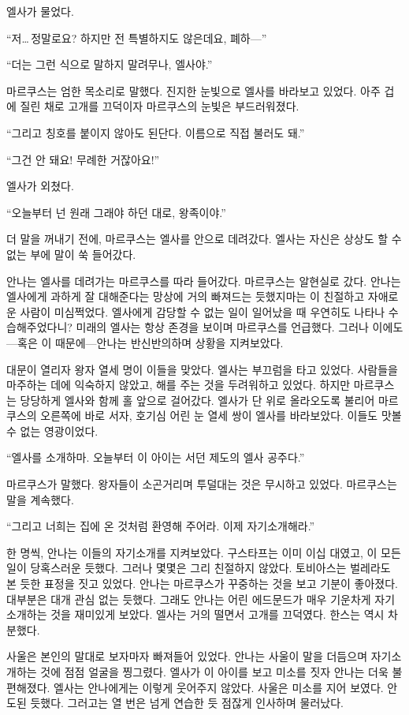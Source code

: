 엘사가 물었다.

``저\ldots\,정말로요? 하지만 전 특별하지도 않은데요, 폐하—''

``더는 그런 식으로 말하지 말려무나, 엘사야.''

마르쿠스는 엄한 목소리로 말했다. 진지한 눈빛으로 엘사를 바라보고 있었다. 아주 겁에 질린 채로 고개를 끄덕이자 마르쿠스의 눈빛은 부드러워졌다.

``그리고 칭호를 붙이지 않아도 된단다. 이름으로 직접 불러도 돼.''

``그건 안 돼요! 무례한 거잖아요!''

엘사가 외쳤다.

``오늘부터 넌 원래 그래야 하던 대로, 왕족이야.''

더 말을 꺼내기 전에, 마르쿠스는 엘사를 안으로 데려갔다. 엘사는 자신은 상상도 할 수 없는 부에 말이 쑥 들어갔다.

안나는 엘사를 데려가는 마르쿠스를 따라 들어갔다. 마르쿠스는 알현실로 갔다. 안나는 엘사에게 과하게 잘 대해준다는 망상에 거의 빠져드는 듯했지마는 이 친절하고 자애로운 사람이 미심쩍었다. 엘사에게 감당할 수 없는 일이 일어났을 때 우연히도 나타나 수습해주었다니? 미래의 엘사는 항상 존경을 보이며 마르쿠스를 언급했다. 그러나 이에도—혹은 이 때문에—안나는 반신반의하며 상황을 지켜보았다.

대문이 열리자 왕자 열세 명이 이들을 맞았다. 엘사는 부끄럼을 타고 있었다. 사람들을 마주하는 데에 익숙하지 않았고, 해를 주는 것을 두려워하고 있었다. 하지만 마르쿠스는 당당하게 엘사와 함께 홀 앞으로 걸어갔다. 엘사가 단 위로 올라오도록 불리어 마르쿠스의 오른쪽에 바로 서자, 호기심 어린 눈 열세 쌍이 엘사를 바라보았다. 이들도 맛볼 수 없는 영광이었다.

``엘사를 소개하마. 오늘부터 이 아이는 서던 제도의 엘사 공주다.''

마르쿠스가 말했다. 왕자들이 소곤거리며 투덜대는 것은 무시하고 있었다. 마르쿠스는 말을 계속했다.

``그리고 너희는 집에 온 것처럼 환영해 주어라. 이제 자기소개해라.''

한 명씩, 안나는 이들의 자기소개를 지켜보았다. 구스타프는 이미 이십 대였고, 이 모든 일이 당혹스러운 듯했다. 그러나 몇몇은 그리 친절하지 않았다. 토비아스는 벌레라도 본 듯한 표정을 짓고 있었다. 안나는 마르쿠스가 꾸중하는 것을 보고 기분이 좋아졌다. 대부분은 대개 관심 없는 듯했다. 그래도 안나는 어린 에드문드가 매우 기운차게 자기소개하는 것을 재미있게 보았다. 엘사는 거의 떨면서 고개를 끄덕였다. 한스는 역시 차분했다.

사울은 본인의 말대로 보자마자 빠져들어 있었다. 안나는 사울이 말을 더듬으며 자기소개하는 것에 점점 얼굴을 찡그렸다. 엘사가 이 아이를 보고 미소를 짓자 안나는 더욱 불편해졌다. 엘사는 안나에게는 이렇게 웃어주지 않았다. 사울은 미소를 지어 보였다. 안도된 듯했다. 그러고는 열 번은 넘게 연습한 듯 점잖게 인사하며 물러났다.

